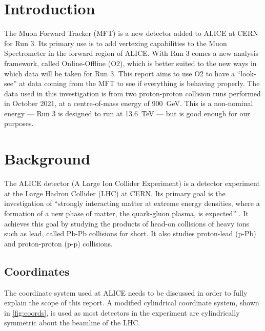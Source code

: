 \documentclass[11pt]{article}
\numberwithin{equation}{section}
\numberwithin{figure}{section}
\numberwithin{table}{section}
\begin{document}
\section{Introduction}
The Muon Forward Tracker (MFT) is a new detector added to ALICE at CERN for Run 3. Its primary use is to add vertexing capabilities to the Muon Spectrometer in the forward region of ALICE. With Run 3 comes a new analysis framework, called Online-Offline (O2), which is better suited to the new ways in which data will be taken for Run 3. This report aims to use O2 to have a ``look-see'' at data coming from the MFT to see if everything is behaving properly. The data used in this investigation is from two proton-proton collision runs performed in October 2021, at a centre-of-mass energy of \SI{900}{\giga\electronvolt}. This is a non-nominal energy --- Run 3 is designed to run at \SI{13.6}{\tera\electronvolt} --- but is good enough for our purposes.


\section{Background}
The ALICE detector (A Large Ion Collider Experiment) is a detector experiment at the Large Hadron Collider (LHC) at CERN. Its primary goal is the investigation of ``strongly interacting matter at extreme energy densities, where a formation of a new phase of matter, the quark-gluon plasma, is expected'' \cite{ALICE_LOI}. It achieves this goal by studying the products of head-on collisions of heavy ions such as lead, called Pb-Pb collisions for short. It also studies proton-lead (p-Pb) and proton-proton (p-p) collisions.  



\subsection{Coordinates}
The coordinate system used at ALICE needs to be discussed in order to fully explain the scope of this report. A modified cylindrical coordinate system, shown in \cref{fig:coords}, is used as most detectors in the experiment are cylindrically symmetric about the beamline of the LHC. 
\end{document}
